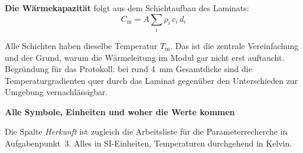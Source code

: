 \documentclass[11pt,a4paper]{article}
\newcommand{\Tm}{T_{\mathrm{m}}}
\newcommand{\Cm}{C_{\mathrm{m}}}
\begin{document}
\vspace{3ex}
{\bfseries Die Wärmekapazität} folgt aus dem Schichtaufbau des Laminats:
\begin{equation*}
  \Cm = A \sum_i \rho_i\, c_i\, d_i
\end{equation*}

\vspace{1ex}
\begin{center}
\end{center}

\vspace{1ex}
Alle Schichten haben dieselbe Temperatur $\Tm$. Das ist die zentrale Vereinfachung
und der Grund, warum die Wärmeleitung im Modul gar nicht erst auftaucht. Begründung
für das Protokoll: bei rund \SI{4}{\milli\metre} Gesamtdicke sind die
Temperaturgradienten quer durch das Laminat gegenüber den Unterschieden zur
Umgebung vernachlässigbar.

\newpage


{\large\bfseries Alle Symbole, Einheiten und woher die Werte kommen}

\vspace{1ex}
Die Spalte \emph{Herkunft} ist zugleich die Arbeitsliste für die Parameterrecherche
in Aufgabenpunkt~3. Alles in SI-Einheiten, Temperaturen durchgehend in Kelvin.
\end{document}
